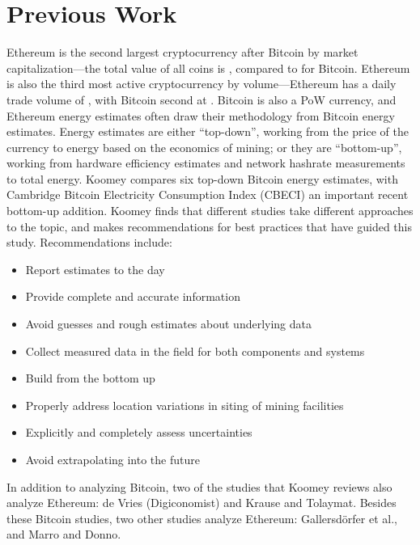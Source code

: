\section{Previous Work}

Ethereum is the second largest cryptocurrency after Bitcoin by market capitalization---the total value of all coins is , compared to  for Bitcoin. Ethereum is also the third most active cryptocurrency by volume---Ethereum has a daily trade volume of , with Bitcoin second at .\cite{coinmarketcap_cryptocurrency_2021} Bitcoin is also a PoW currency, and Ethereum energy estimates often draw their methodology from Bitcoin energy estimates. Energy estimates are either ``top-down'', working from the price of the currency to energy based on the economics of mining; or they are ``bottom-up'', working from hardware efficiency estimates and network hashrate measurements to total energy. Koomey\cite{koomey_estimating_2019} compares six top-down Bitcoin energy estimates, with Cambridge Bitcoin Electricity Consumption Index (CBECI)\cite{cambridge_centre_for_alternative_finance_cambridge_2021} an important recent bottom-up addition. Koomey finds that different studies take different approaches to the topic, and makes recommendations for best practices that have guided this study. Recommendations include:

\begin{itemize}
    \item Report estimates to the day
    \item Provide complete and accurate information
    \item Avoid guesses and rough estimates about underlying data
    \item Collect measured data in the field for both components and systems
    \item Build from the bottom up
    \item Properly address location variations in siting of mining facilities
    \item Explicitly and completely assess uncertainties
    \item Avoid extrapolating into the future
\end{itemize}

In addition to analyzing Bitcoin, two of the studies that Koomey reviews also analyze Ethereum: de Vries\cite{de_vries_ethereum_2021} (Digiconomist) and Krause and Tolaymat\cite{krause_quantification_2018}. Besides these Bitcoin studies, two other studies analyze Ethereum: Gallersdörfer et al.\cite{gallersdorfer_energy_2020}, and Marro and Donno\cite{marro_greennftgreen_2021}.

